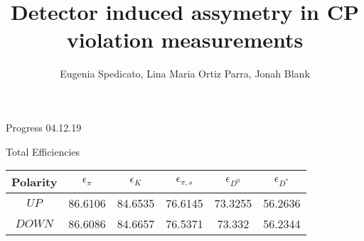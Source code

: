 \documentclass[11pt]{beamer}
\author{Eugenia Spedicato, Lina Maria Ortiz Parra, Jonah Blank}
\title{Detector induced assymetry in CP violation measurements}
\begin{document}
\begin{frame}
\titlepage
\end{frame}


\begin{frame}
\begin{LARGE}
Progress 04.12.19
\end{LARGE}
\end{frame}
\begin{frame}{Total Efficiencies}
\begin{table}
	\begin{tabular}{cS[table-format=2.4]S[table-format=2.4]S[table-format=2.4]S[table-format=2.4]S[table-format=2.4]}
		\toprule
		{Polarity} & {$\epsilon_{\pi} $} & {$\epsilon_{K} $} & {$ \epsilon_{\pi,s} $} & {$\epsilon_{D^0} $} & {$\epsilon_{D^*} $} \\
		\midrule
		$UP$ & 86.6106 & 84.6535 & 76.6145 & 73.3255 & 56.2636 \\
		$DOWN$ & 86.6086 & 84.6657 & 76.5371 & 73.332 & 56.2344 \\
		\bottomrule
	\end{tabular}
\end{table}
\end{frame}
\begin{frame}{}

\end{frame}
\end{document}
